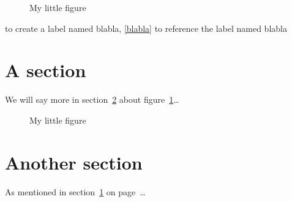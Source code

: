 \documentclass[12pt]{article}
\begin{document}
\begin{figure}[ht]
	\centering
	\caption{My little figure}
\end{figure}



\label{blabla} to create a label named blabla,
\ref{blabla} to reference the label named blabla



\section{A section} \label{melabel}
We will say more in section~\ref{othersec}
about figure~\ref{myfig}\ldots{}
\begin{figure}[ht]
	\centering
	\caption{My little figure} \label{myfig}
\end{figure}
\section{Another section} \label{othersec}
As mentioned in section~\ref{melabel}
on page~\pageref{melabel}\ldots{}
\end{document}
